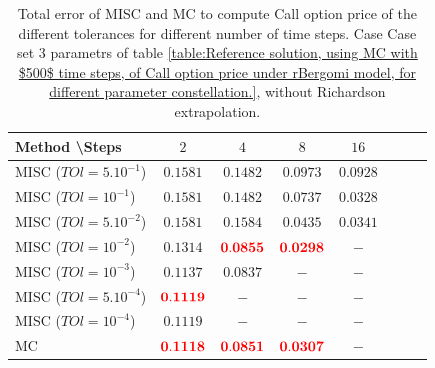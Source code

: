 \documentclass[11pt]{article}
\begin{document}
\begin{table}[h!]
\centering
\begin{tabular}{l*{6}{c}r}
Method \textbackslash  Steps            & $2$ & $4$ & $8$ & $16$  \\
\hline
MISC ($TOl=5.10^{-1}$)  & $\mathbf{0.1581}$ & $\mathbf{0.1482}$ & $\mathbf{ 0.0973}$ & $\mathbf{ 0.0928}$  \\
MISC ($TOl=10^{-1}$)  & $\mathbf{0.1581}$ & $\mathbf{0.1482}$ & $\mathbf{ 0.0737}$ & $\mathbf{0.0328}$  \\
MISC ($TOl=5.10^{-2}$)  &$\mathbf{0.1581}$ & $\mathbf{0.1584}$ & $\mathbf{0.0435}$ & $\mathbf{0.0341}$  \\
MISC ($TOl=10^{-2}$)  & $\mathbf{0.1314}$ & $\mathbf{{\color{red}0.0855}}$ & $\mathbf{{\color{red}0.0298}}$ &$-$ \\
MISC ($TOl=10^{-3}$)  & $\mathbf{0.1137}$ & $\mathbf{0.0837}$ & $-$ & $\mathbf{-}$  \\
MISC ($TOl=5.10^{-4}$)  & $\mathbf{{\color{red}0.1119}}$ & $\mathbf{-}$ & $\mathbf{-}$ & $\mathbf{-}$  \\
MISC ($TOl=10^{-4}$)  & $\mathbf{0.1119}$ & $\mathbf{-}$ & $\mathbf{-}$ & $\mathbf{-}$  \\
\hline
MC    &  $\mathbf{{\color{red}0.1118}}$   &$\mathbf{{\color{red}0.0851}}$ & $\mathbf{{\color{red}0.0307}}$ & $\mathbf{-}$  \\

\hline
\end{tabular}
\caption{Total error of MISC and MC to compute Call option price of the different tolerances for different number of time steps. Case Case set $3$ parametrs of table \ref{table:Reference solution, using MC with $500$ time steps, of Call option price under rBergomi model, for different parameter constellation.}, without Richardson extrapolation.}
\label{Total error of MISC and MC to compute Call option price of the different tolerances for different number of time steps. Case set 3, without Richardson extrapolation. The numbers between parentheses are the corresponding absolute errors.}
\end{table}
\end{document}
